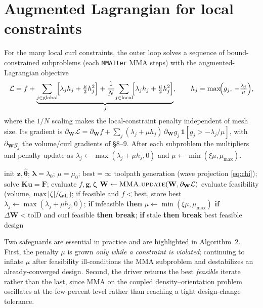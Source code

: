 \documentclass[11pt]{article}
\newcommand{\vthh}{\hat{\bm{\theta}}}
\newcommand{\vz}{\mathbf{z}}
\newcommand{\vu}{\mathbf{u}}
\newcommand{\vF}{\mathbf{F}}
\newcommand{\vK}{\mathbf{K}}
\newcommand{\vW}{\mathbf{W}}
\begin{document}
\section{Augmented Lagrangian for local constraints}
For the many local curl constraints, the outer loop solves a sequence of
bound-constrained subproblems (each \texttt{MMAIter} MMA steps) with the
augmented-Lagrangian objective
\begin{equation}
  \mathcal L=f+\underbrace{\sum_{j\in\text{global}}\!\Bigl[\lambda_j h_j
  +\tfrac\mu2 h_j^2\Bigr]
  +\frac1N\!\sum_{j\in\text{local}}\!\Bigl[\lambda_j h_j+\tfrac\mu2 h_j^2\Bigr]}
  _{J},\qquad
  h_j=\max\!\Bigl(g_j,\,-\tfrac{\lambda_j}{\mu}\Bigr),
  \label{eq:al}
\end{equation}
where the $1/N$ scaling makes the local-constraint penalty independent of mesh
size. Its gradient is
$\partial_{\vW}\mathcal L=\partial_{\vW} f+\sum_j(\lambda_j+\mu h_j)\,\partial_{\vW} g_j
\,\mathbf 1[g_j>-\lambda_j/\mu]$, with $\partial_{\vW} g_j$ the volume/curl
gradients of \S8--9. After each subproblem the multipliers and penalty update as
$\lambda_j\leftarrow\max(\lambda_j+\mu h_j,0)$ and $\mu\leftarrow\min(\xi\mu,
\mu_{\max})$.

\begin{algorithm}[h]
\caption{Augmented-Lagrangian driver (\texttt{optimize\_cfrp})}
\begin{algorithmic}[1]
\State init $\vz,\vthh$; $\bm\lambda\!=\!\lambda_0$; $\mu\!=\!\mu_0$;
  $\text{best}\!=\!\infty$
   
    \State toolpath generation (wave projection \eqref{eq:chi}); solve
      $\vK\vu=\vF$; evaluate $f,\mathbf g,\bm\zeta$
    \State $\vW\gets\textsc{MMA.update}(\vW,\partial_{\vW}\mathcal L)$
  \EndFor
  \State evaluate feasibility (volume, $\max|\zeta|/\zeta_{\rm all}$); if
    feasible and $f<\text{best}$, store best
  \State $\lambda_j\gets\max(\lambda_j+\mu h_j,0)$;\;
    \textbf{if} infeasible \textbf{then} $\mu\gets\min(\xi\mu,\mu_{\max})$
  \State \textbf{if} $\Delta\vW<\text{tolD}$ and curl feasible \textbf{then
    break}; \textbf{if} stale \textbf{then break}
\EndFor
\State \Return best feasible design
\end{algorithmic}
\end{algorithm}

Two safeguards are essential in practice and are highlighted in Algorithm~2.
First, the penalty $\mu$ is grown \emph{only while a constraint is violated};
continuing to inflate $\mu$ after feasibility ill-conditions the MMA subproblem
and destabilizes an already-converged design. Second, the driver returns the best
\emph{feasible} iterate rather than the last, since MMA on the coupled
density--orientation problem oscillates at the few-percent level rather than
reaching a tight design-change tolerance.
\end{document}
